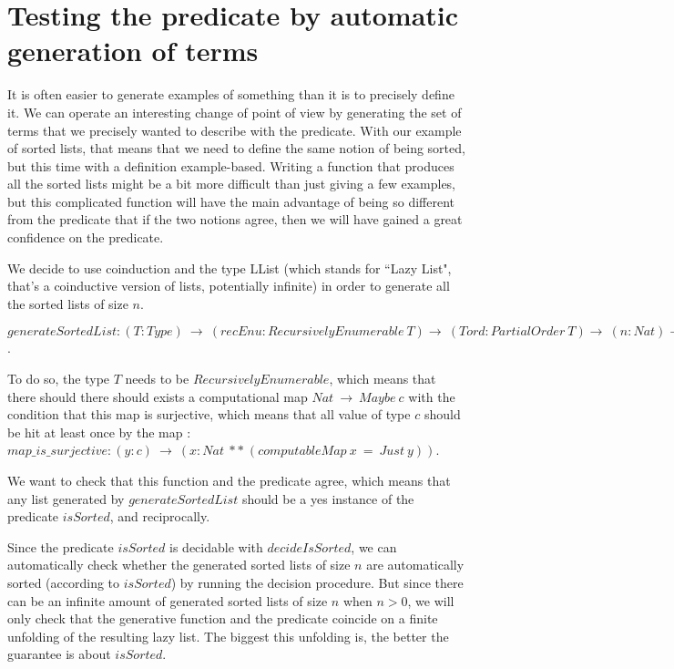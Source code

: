 \section{Testing the predicate by automatic generation of terms}

\label{sect:testingInside}


It is often easier to generate examples of something than it is to precisely define it. We can operate an interesting change of point of view by generating the set of terms that we precisely wanted to describe with the predicate. With our example of sorted lists, that means that we need to define the same notion of being sorted, but this time with a definition example-based. Writing a function that produces all the sorted lists might be a bit more difficult than just giving a few examples, but this complicated function will have the main advantage of being so different from the predicate that if the two notions agree, then we will have gained a great confidence on the predicate.

We decide to use coinduction and the type LList (which stands for ``Lazy List", that's a coinductive version of lists, potentially infinite) in order to generate all the sorted lists of size $n$.

$generateSortedList : (T:Type)\ \rightarrow\ (recEnu:RecursivelyEnumerable\ T) \rightarrow\ (Tord : PartialOrder\ T) \rightarrow\ (n:Nat) \rightarrow LList (List T)$.

To do so, the type $T$ needs to be $RecursivelyEnumerable$, which means that there should there should exists a computational map $Nat\ \rightarrow\ Maybe\ c$ with the condition that this map is surjective, which means that all value of type $c$ should be hit at least once by the map : $map\_is\_surjective : (y:c)\ \rightarrow\ (x:Nat\ **\ (computableMap\ x\ =\ Just\ y))$.

We want to check that this function and the predicate agree, which means that any list generated by $generateSortedList$ should be a yes instance of the predicate $isSorted$, and reciprocally.

Since the predicate $isSorted$ is decidable with $decideIsSorted$, we can automatically check whether the generated sorted lists of size $n$ are automatically sorted (according to $isSorted$) by running the decision procedure. But since there can be an infinite amount of generated sorted lists of size $n$ when $n > 0$, we will only check that the generative function and the predicate coincide on a finite unfolding of the resulting lazy list. The biggest this unfolding is, the better the guarantee is about $isSorted$.

